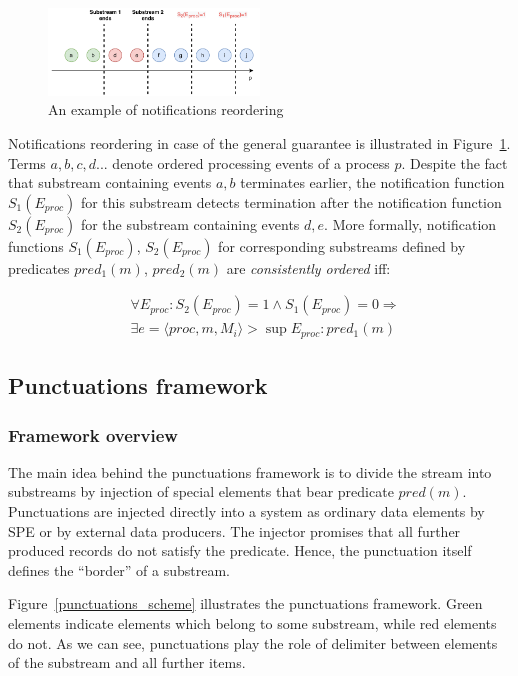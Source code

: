 \begin{figure}[htbp]
  \centering
  \includegraphics[width=0.50\textwidth]{pics/notifications-reordering.pdf}
  \caption{An example of notifications reordering}
  \label{notifications_reordering}
\end{figure}

Notifications reordering in case of the general guarantee is illustrated in Figure~\ref{notifications_reordering}. Terms $a,b,c,d...$ denote ordered processing events of a process $p$. Despite the fact that substream containing events $a,b$ terminates earlier, the notification function $S_1(E_{proc})$ for this substream detects termination after the notification function $S_2(E_{proc})$ for the substream containing events $d,e$. More formally, notification functions $S_1(E_{proc})$, $S_2(E_{proc})$ for corresponding substreams defined by predicates $pred_1(m)$, $pred_2(m)$ are {\em consistently ordered} iff:

\begin{align*}
& \forall E_{proc}: S_2(E_{proc})=1 \wedge S_1(E_{proc})=0 \Longrightarrow  \\
& \exists e=\langle proc, m, M_i\rangle > \sup E_{proc} : pred_1(m)
\end{align*}

\subsection{Punctuations framework}

\subsubsection{Framework overview}

The main idea behind the punctuations framework is to divide the stream into substreams by injection of special elements that bear predicate $pred(m)$. Punctuations are injected directly into a system as ordinary data elements by SPE or by external data producers. The injector promises that all further produced records do not satisfy the predicate. Hence, the punctuation itself defines the ``border'' of a substream.

Figure~\ref{punctuations_scheme} illustrates the punctuations framework. Green elements indicate elements which belong to some substream, while red elements do not. As we can see, punctuations play the role of delimiter between elements of the substream and all further items.


